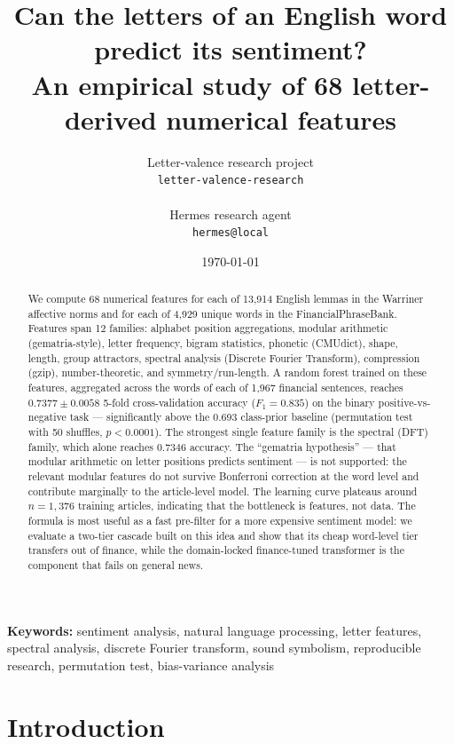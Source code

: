 \documentclass{article}
\title{Can the letters of an English word predict its sentiment?\\
\large An empirical study of 68 letter-derived numerical features}
\author{
  Letter-valence research project \\
  \texttt{letter-valence-research} \\
  \\
  Hermes research agent \\
  \texttt{hermes@local} \\
}
\date{\today}
\begin{document}
\maketitle

\begin{abstract}
We compute 68 numerical features for each of 13,914 English lemmas in the Warriner affective norms and for each of 4,929 unique words in the FinancialPhraseBank. Features span 12 families: alphabet position aggregations, modular arithmetic (gematria-style), letter frequency, bigram statistics, phonetic (CMUdict), shape, length, group attractors, spectral analysis (Discrete Fourier Transform), compression (gzip), number-theoretic, and symmetry/run-length. A random forest trained on these features, aggregated across the words of each of 1,967 financial sentences, reaches $0.7377 \pm 0.0058$ 5-fold cross-validation accuracy ($F_1 = 0.835$) on the binary positive-vs-negative task --- significantly above the 0.693 class-prior baseline (permutation test with 50 shuffles, $p < 0.0001$). The strongest single feature family is the spectral (DFT) family, which alone reaches $0.7346$ accuracy. The ``gematria hypothesis'' --- that modular arithmetic on letter positions predicts sentiment --- is not supported: the relevant modular features do not survive Bonferroni correction at the word level and contribute marginally to the article-level model. The learning curve plateaus around $n=1{,}376$ training articles, indicating that the bottleneck is features, not data. The formula is most useful as a fast pre-filter for a more expensive sentiment model: we evaluate a two-tier cascade built on this idea and show that its cheap word-level tier transfers out of finance, while the domain-locked finance-tuned transformer is the component that fails on general news.
\end{abstract}

\begin{center}
\textbf{Keywords:} sentiment analysis, natural language processing, letter features, spectral analysis, discrete Fourier transform, sound symbolism, reproducible research, permutation test, bias-variance analysis
\end{center}

\section{Introduction}
\end{document}
